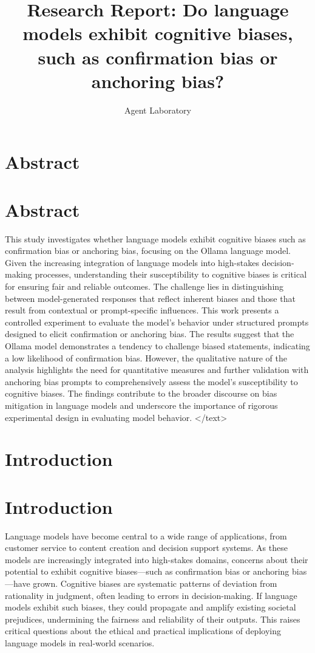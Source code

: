 \documentclass{article}
\title{Research Report: Do language models exhibit cognitive biases, such as confirmation bias or anchoring bias?}
\author{Agent Laboratory}
\begin{document}
\maketitle
\section{Abstract}
\section*{Abstract}
This study investigates whether language models exhibit cognitive biases such as confirmation bias or anchoring bias, focusing on the Ollama language model. Given the increasing integration of language models into high-stakes decision-making processes, understanding their susceptibility to cognitive biases is critical for ensuring fair and reliable outcomes. The challenge lies in distinguishing between model-generated responses that reflect inherent biases and those that result from contextual or prompt-specific influences. This work presents a controlled experiment to evaluate the model's behavior under structured prompts designed to elicit confirmation or anchoring bias. The results suggest that the Ollama model demonstrates a tendency to challenge biased statements, indicating a low likelihood of confirmation bias. However, the qualitative nature of the analysis highlights the need for quantitative measures and further validation with anchoring bias prompts to comprehensively assess the model's susceptibility to cognitive biases. The findings contribute to the broader discourse on bias mitigation in language models and underscore the importance of rigorous experimental design in evaluating model behavior.
</text>
\section{Introduction}
\section{Introduction}

Language models have become central to a wide range of applications, from customer service to content creation and decision support systems. As these models are increasingly integrated into high-stakes domains, concerns about their potential to exhibit cognitive biases—such as confirmation bias or anchoring bias—have grown. Cognitive biases are systematic patterns of deviation from rationality in judgment, often leading to errors in decision-making. If language models exhibit such biases, they could propagate and amplify existing societal prejudices, undermining the fairness and reliability of their outputs. This raises critical questions about the ethical and practical implications of deploying language models in real-world scenarios.
\end{document}
